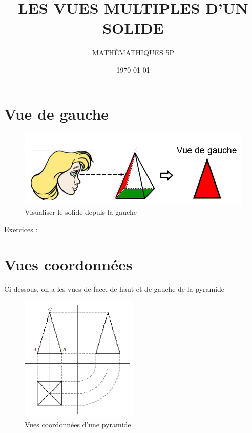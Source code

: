 \documentclass[a4paper, 12 pt]{article}
\title{\LARGE \textbf{LES VUES MULTIPLES D'UN SOLIDE}}
\author{MATH\'EMATHIQUES 5P}
\date{\today}
\begin{document}
    \Large
    

    \begin{titlepage}
        
        \maketitle
    \end{titlepage}
    
    \setcounter{page}{2}



    \section{Vue de gauche}

        \begin{figure}[H]
            \centering
            \includegraphics[width = 1\linewidth]{img/vueGauche.PNG}
            \caption[]{Visualiser le solide depuis la gauche}
        \end{figure}


    Exercices :

   \newpage
   \section{Vues coordonnées}
    Ci-dessous, on a les vues de face, de haut et de gauche de la pyramide
        \begin{figure}[H]
            \centering
            \includegraphics[width = 0.6\linewidth]{img/coordo.PNG}
            \caption[]{Vues coordonnées d'une pyramide}
        \end{figure}
\end{document}
